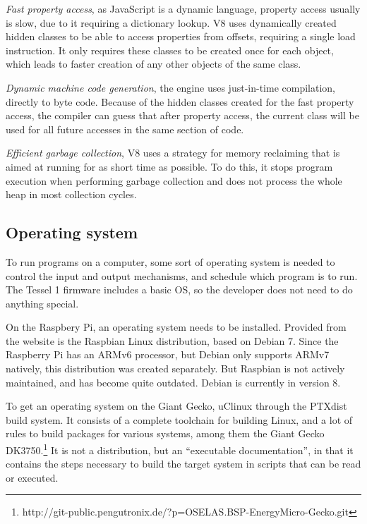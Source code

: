 \emph{Fast property access}, as JavaScript is a dynamic language, property access usually is slow, due to it requiring a dictionary lookup.
V8 uses dynamically created hidden classes to be able to access properties from offsets, requiring a single load instruction.
It only requires these classes to be created once for each object, which leads to faster creation of any other objects of the same class.

\emph{Dynamic machine code generation}, the engine uses just-in-time compilation, directly to byte code.
Because of the hidden classes created for the fast property access, the compiler can guess that after property access, the current class will be used for all future accesses in the same section of code.

\emph{Efficient garbage collection}, V8 uses a strategy for memory reclaiming that is aimed at running for as short time as possible. To do this, it stops program execution when performing garbage collection and does not process the whole heap in most collection cycles.


\subsection{Operating system}
To run programs on a computer, some sort of operating system is needed to control the input and output mechanisms, and schedule which program is to run.
The Tessel 1 firmware includes a basic OS, so the developer does not need to do anything special.

On the Raspbery Pi, an operating system needs to be installed.
Provided from the website is the Raspbian Linux distribution, based on Debian 7.
Since the Raspberry Pi has an ARMv6 processor, but Debian only supports ARMv7 natively, this distribution was created separately.
But Raspbian is not actively maintained, and has become quite outdated.
Debian is currently in version 8.

To get an operating system on the Giant Gecko, uClinux through the PTXdist build system.
It consists of a complete toolchain for building Linux, and a lot of rules to build packages for various systems, among them the Giant Gecko DK3750.\footnote{http://git-public.pengutronix.de/?p=OSELAS.BSP-EnergyMicro-Gecko.git}
It is not a distribution, but an ``executable documentation'', in that it contains the steps necessary to build the target system in scripts that can be read or executed.\citep{ptxdistguru}

